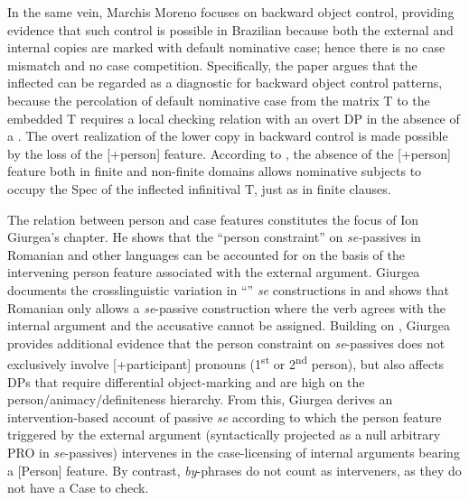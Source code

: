 \documentclass[output=paper]{langsci/langscibook}
\begin{document}
In the same vein, Marchis Moreno focuses on backward object control, providing evidence that such control is possible in Brazilian  because both the external and internal copies are marked with default nominative case; hence there is no case mismatch and no case competition. Specifically, the paper argues that the inflected  can be regarded as a diagnostic for backward object control patterns, because the percolation of default nominative case from the matrix T to the embedded T requires a local checking relation with an overt DP in the absence of a . The overt realization of the lower copy in backward control is made possible by the loss of the [+person] feature. According to \citet{Cyrino2010}, the absence of the [+person] feature both in finite and non-finite domains allows nominative subjects to occupy the Spec of the inflected infinitival T, just as in finite clauses.

The relation between person and case features constitutes the focus of Ion Giurgea’s chapter. He shows that the ``person constraint'' on \textit{se-}passives in Romanian and other  languages can be accounted for on the basis of the intervening person feature associated with the external argument. Giurgea documents the crosslinguistic variation in ``'' \textit{se} constructions in  and shows that Romanian only allows a \textit{se}{}-passive construction where the verb agrees with the internal argument and the accusative cannot be assigned. Building on \citet{Cornilescu1998}, Giurgea provides additional evidence that the person constraint on \textit{se}{}-passives does not exclusively involve [+participant] pronouns (1\textsuperscript{st} or 2\textsuperscript{nd} person), but also affects DPs that require differential object-marking and are high on the person\slash animacy\slash definiteness hierarchy. From this, Giurgea derives an intervention-based account of passive \textit{se} according to which the person feature triggered by the external argument (syntactically projected as a null arbitrary PRO in \textit{se}{}-passives) intervenes in the case-licensing of internal arguments bearing a [Person] feature. By contrast, \textit{by}{}-phrases do not count as interveners, as they do not have a Case to check.
\end{document}

